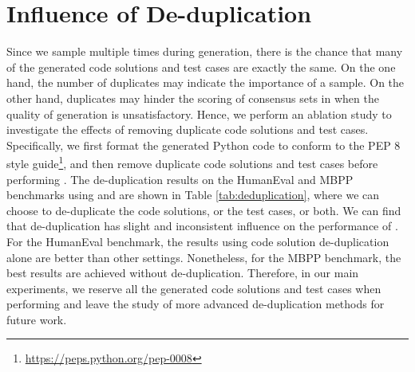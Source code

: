 \begin{table}[t]
    \centering
    \caption{Pass@ () on the HumanEval and MBPP benchmarks using \ours and \cushman with different de-duplication settings. The setting ``No No" in the first line means that neither the code solutions nor the test cases are de-duplicated, which is used in our main experiments.}
    \label{tab:deduplication}
\end{table}

\section{Influence of De-duplication}
\label{appendix_dedup}
Since we sample multiple times during generation, there is the chance that many of the generated code solutions and test cases are exactly the same. On the one hand, the number of duplicates may indicate the importance of a sample. On the other hand, duplicates may hinder the scoring of consensus sets in \ours when the quality of generation is unsatisfactory. Hence, we perform an ablation study to investigate the effects of removing duplicate code solutions and test cases.
Specifically, we first format the generated Python code to conform to the PEP 8 style guide\footnote{\url{https://peps.python.org/pep-0008}}, and then remove duplicate code solutions and test cases before performing \ours. The de-duplication results on the HumanEval and MBPP benchmarks using \ours and \cushman are shown in Table \ref{tab:deduplication}, where we can choose to de-duplicate the code solutions, or the test cases, or both. We can find that de-duplication has slight and inconsistent influence on the performance of \ours. For the HumanEval benchmark, the  results using code solution de-duplication alone are better than other settings. Nonetheless, for the MBPP benchmark, the best  results are achieved without de-duplication. Therefore, in our main experiments, we reserve all the generated code solutions and test cases when performing \ours and leave the study of more advanced de-duplication methods for future work.



